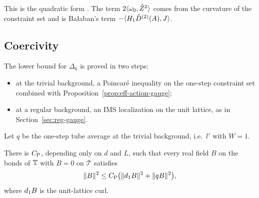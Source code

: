 This is the quadratic form \cite[(53)--(54)]{BalUV3}. The term $2\langle \omega_0,\hat Z^2\rangle$ comes from the curvature of the constraint set and is Ba\l aban's term $-\langle H_1\hat D^{(2)}(A),J\rangle$.

\subsection{Coercivity}

The lower bound for $\Delta_k$ is proved in two steps:
\begin{itemize}
\item at the trivial background, a Poincar\'e inequality on the one-step constraint set combined with Proposition~\ref{prop:eff-action-gauge};
\item at a regular background, an IMS localization on the unit lattice, as in Section~\ref{sec:reg-gauge}.
\end{itemize}
Let $q$ be the one-step tube average at the trivial background, i.e.\ $l'$ with $W=1$.

\begin{lemma}\label{lem:poincare-step}
There is $C_{\rm P}$, depending only on $d$ and $L$, such that every real field $B$ on the bonds of $\mathbb T$ with $B=0$ on $\mathcal T$ satisfies
\[
\|B\|^2\le C_{\rm P}\big(\|d_1 B\|^2+\|qB\|^2\big),
\]
where $d_1 B$ is the unit-lattice curl.
\end{lemma}

